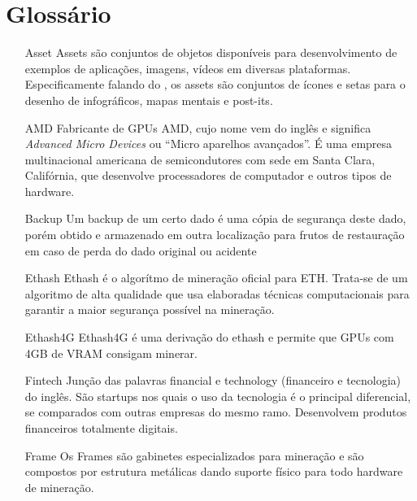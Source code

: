 \chapter*{Glossário}
\pagestyle{empty}

\begin{center}
	\begin{itemize}
		\item[Asset] Assets são conjuntos de objetos disponíveis para desenvolvimento de exemplos de aplicações, imagens, vídeos em diversas plataformas. Especificamente falando do \cite{WHIM}, os assets são conjuntos de ícones e setas para o desenho de infográficos, mapas mentais e post-its.
		 
		\item[AMD] Fabricante de GPUs AMD, cujo nome vem do inglês e significa \textit{Advanced Micro Devices} ou ``Micro aparelhos avançados''. É uma empresa multinacional americana de semicondutores com sede em Santa Clara, Califórnia, que desenvolve processadores de computador e outros tipos de hardware. 
		
		\item[Backup] Um backup de um certo dado é uma cópia de segurança deste dado, porém obtido e armazenado em outra localização para frutos de restauração em caso de perda do dado original ou  acidente 
		
		\item[Ethash] Ethash é o algorítmo de mineração oficial para ETH. Trata-se de um algoritmo de alta qualidade que usa elaboradas técnicas computacionais para garantir a maior segurança possível na mineração.
		
		\item[Ethash4G] Ethash4G é uma derivação do ethash e permite que GPUs com 4GB de VRAM consigam minerar.
		
		\item[Fintech] Junção das palavras financial e technology (financeiro e tecnologia) do inglês. São startups nos quais o uso da tecnologia é o principal diferencial, se comparados com outras empresas do mesmo ramo. Desenvolvem produtos financeiros totalmente digitais. 
		
		\item[Frame] Os Frames são gabinetes especializados para mineração e são compostos por estrutura metálicas dando suporte físico para todo hardware de mineração.
		

\end{itemize}
\end{center}
